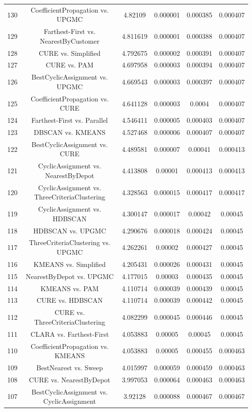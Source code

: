 \documentclass[a4paper,10pt]{article}
\begin{document}
\begin{landscape}
\begin{table}[!htp]
\begin{tabular}{cccccc}
130&CoefficientPropagation vs. UPGMC&4.82109&0.000001&0.000385&0.000407\\
129&Farthest-First vs. NearestByCustomer&4.811619&0.000001&0.000388&0.000407\\
128&CURE vs. Simplified&4.792675&0.000002&0.000391&0.000407\\
127&CURE vs. PAM&4.697958&0.000003&0.000394&0.000407\\
126&BestCyclicAssignment vs. UPGMC&4.669543&0.000003&0.000397&0.000407\\
125&CoefficientPropagation vs. CURE&4.641128&0.000003&0.0004&0.000407\\
124&Farthest-First vs. Parallel&4.546411&0.000005&0.000403&0.000407\\
123&DBSCAN vs. KMEANS&4.527468&0.000006&0.000407&0.000407\\
122&BestCyclicAssignment vs. CURE&4.489581&0.000007&0.00041&0.000413\\
121&CyclicAssignment vs. NearestByDepot&4.413808&0.00001&0.000413&0.000413\\
120&CyclicAssignment vs. ThreeCriteriaClustering&4.328563&0.000015&0.000417&0.000417\\
119&CyclicAssignment vs. HDBSCAN&4.300147&0.000017&0.00042&0.00045\\
118&HDBSCAN vs. UPGMC&4.290676&0.000018&0.000424&0.00045\\
117&ThreeCriteriaClustering vs. UPGMC&4.262261&0.00002&0.000427&0.00045\\
116&KMEANS vs. Simplified&4.205431&0.000026&0.000431&0.00045\\
115&NearestByDepot vs. UPGMC&4.177015&0.00003&0.000435&0.00045\\
114&KMEANS vs. PAM&4.110714&0.000039&0.000439&0.00045\\
113&CURE vs. HDBSCAN&4.110714&0.000039&0.000442&0.00045\\
112&CURE vs. ThreeCriteriaClustering&4.082299&0.000045&0.000446&0.00045\\
111&CLARA vs. Farthest-First&4.053883&0.00005&0.00045&0.00045\\
110&CoefficientPropagation vs. KMEANS&4.053883&0.00005&0.000455&0.000463\\
109&BestNearest vs. Sweep&4.015997&0.000059&0.000459&0.000463\\
108&CURE vs. NearestByDepot&3.997053&0.000064&0.000463&0.000463\\
107&BestCyclicAssignment vs. CyclicAssignment&3.92128&0.000088&0.000467&0.000467\\

\end{tabular}
\end{table}
\end{landscape}
\end{document}
